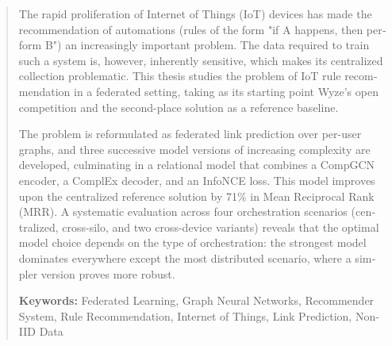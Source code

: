 \begin{english}

\begin{abstract}
The rapid proliferation of Internet of Things (IoT) devices has made the recommendation of automations (rules of the form "if A happens, then perform B") an increasingly important problem. The data required to train such a system is, however, inherently sensitive, which makes its centralized collection problematic. This thesis studies the problem of IoT rule recommendation in a federated setting, taking as its starting point Wyze's open competition and the second-place solution as a reference baseline.

The problem is reformulated as federated link prediction over per-user graphs, and three successive model versions of increasing complexity are developed, culminating in a relational model that combines a CompGCN encoder, a ComplEx decoder, and an InfoNCE loss. This model improves upon the centralized reference solution by 71\% in Mean Reciprocal Rank (MRR). A systematic evaluation across four orchestration scenarios (centralized, cross-silo, and two cross-device variants) reveals that the optimal model choice depends on the type of orchestration: the strongest model dominates everywhere except the most distributed scenario, where a simpler version proves more robust.

\vspace{1em}
\noindent\textbf{Keywords:} Federated Learning, Graph Neural Networks, Recommender System, Rule Recommendation, Internet of Things, Link Prediction, Non-IID Data
\end{abstract}

\end{english}
